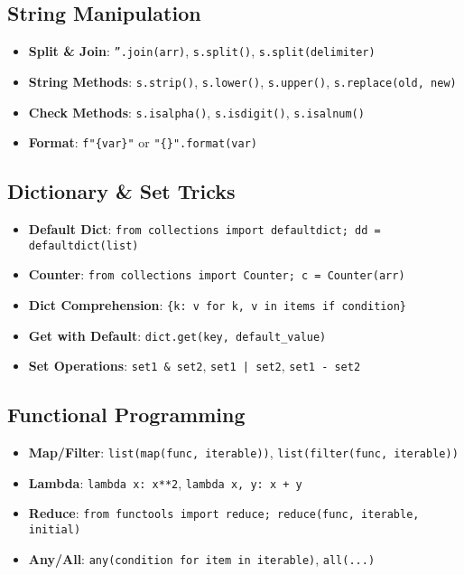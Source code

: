 \subsection{String Manipulation}
\begin{itemize}
    \item \textbf{Split \& Join}: \texttt{''.join(arr)}, \texttt{s.split()}, \texttt{s.split(delimiter)}
    \item \textbf{String Methods}: \texttt{s.strip()}, \texttt{s.lower()}, \texttt{s.upper()}, \texttt{s.replace(old, new)}
    \item \textbf{Check Methods}: \texttt{s.isalpha()}, \texttt{s.isdigit()}, \texttt{s.isalnum()}
    \item \textbf{Format}: \texttt{f"\{var\}"} or \texttt{"\{\}".format(var)}
\end{itemize}

\subsection{Dictionary \& Set Tricks}
\begin{itemize}
    \item \textbf{Default Dict}: \texttt{from collections import defaultdict; dd = defaultdict(list)}
    \item \textbf{Counter}: \texttt{from collections import Counter; c = Counter(arr)}
    \item \textbf{Dict Comprehension}: \texttt{\{k: v for k, v in items if condition\}}
    \item \textbf{Get with Default}: \texttt{dict.get(key, default\_value)}
    \item \textbf{Set Operations}: \texttt{set1 \& set2}, \texttt{set1 | set2}, \texttt{set1 - set2}
\end{itemize}

\subsection{Functional Programming}
\begin{itemize}
    \item \textbf{Map/Filter}: \texttt{list(map(func, iterable))}, \texttt{list(filter(func, iterable))}
    \item \textbf{Lambda}: \texttt{lambda x: x**2}, \texttt{lambda x, y: x + y}
    \item \textbf{Reduce}: \texttt{from functools import reduce; reduce(func, iterable, initial)}
    \item \textbf{Any/All}: \texttt{any(condition for item in iterable)}, \texttt{all(...)}
\end{itemize}

